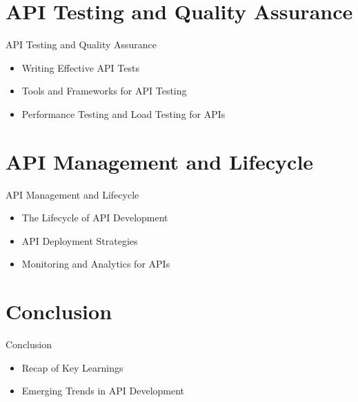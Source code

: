 \documentclass{beamer}
\begin{document}


\section{API Testing and Quality Assurance}
\begin{frame}{API Testing and Quality Assurance}
  \begin{itemize}
    \item Writing Effective API Tests
    \item Tools and Frameworks for API Testing
    \item Performance Testing and Load Testing for APIs
  \end{itemize}
\end{frame}


\section{API Management and Lifecycle}
\begin{frame}{API Management and Lifecycle}
  \begin{itemize}
    \item The Lifecycle of API Development
    \item API Deployment Strategies
    \item Monitoring and Analytics for APIs
  \end{itemize}
\end{frame}

\section{Conclusion}
\begin{frame}{Conclusion}
  \begin{itemize}
    \item Recap of Key Learnings
    \item Emerging Trends in API Development
  \end{itemize}
\end{frame}
\end{document}
